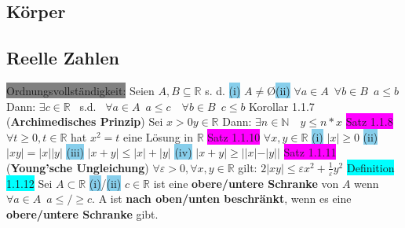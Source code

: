 \documentclass[landscape, 10pt]{article}
\newcommand{\R}{\mathbb{R}}
\newcommand{\N}{\mathbb{N}}
\begin{document}
\pagestyle{fancy}
\fancyhf{}
\cfoot{\thepage}

\begin{multicols}{3}
\section{Körper}
\subsection{Reelle Zahlen}
\colorbox{gray}{Ordnungsvollständigkeit:} Seien $A, B\subseteq\R$ s. d.
                \quad\colorbox{SkyBlue}{(i)} $A\neq$\O\colorbox{SkyBlue}{(ii)} 
                $\forall a\in A \enspace \forall b 
                \in B \enspace a \leqslant b$ 
         Dann: $\exists c\in\R\enspace$ 
                s.d. $\enspace\forall a\in A\enspace a\leqslant c\quad\forall b\in 
                B\enspace c\leqslant b$ 
\colorbox{BurntOrange}{Korollar 1.1.7} (\textbf{Archimedisches Prinzip}) 
                Sei \textcolor{NavyBlue}{$x>0 y\in\R$}
                \quad Dann: \textcolor{NavyBlue}{
                $\exists n\in \N \quad y\leqslant n*x$}
\colorbox{magenta}{Satz 1.1.8} \textcolor{NavyBlue}{
                $\forall t\geqslant 0, t\in\R$} hat \textcolor{NavyBlue}{$x^2=t$} 
                eine Lösung in $\R$
\colorbox{magenta}{Satz 1.1.10} $\forall x,y\in\R$ 
        \colorbox{SkyBlue}{(i)} $|x|\geqslant 0$ \quad\colorbox{SkyBlue}{(ii)} 
                $|xy|=|x||y|$ \quad
                \colorbox{SkyBlue}{(iii)} $|x+y|\leqslant |x|+|y|$
                \quad\colorbox{SkyBlue}{(iv)} $|x+y|\geqslant ||x|-|y||$
\colorbox{magenta}{Satz 1.1.11} (\textbf{Young'sche Ungleichung})
                \textcolor{NavyBlue}{
                $\forall\varepsilon >0, \forall x,y\in\R$} 
                gilt: \qquad \textcolor{NavyBlue}{
                $2|xy|\leqslant\varepsilon x^2+\frac{1}{\varepsilon}y^2$}
\colorbox{cyan}{Definition 1.1.12} Sei $A\subset\R$
         \colorbox{SkyBlue}{(i)}/\colorbox{SkyBlue}{(ii)} $c\in\R$ ist eine 
                \textbf{obere/untere Schranke }
                von $A$ wenn \textcolor{NavyBlue}{
                $\forall a \in A \enspace a\leqslant / \geqslant c$}. A ist 
                \textbf{nach oben/unten 
         beschränkt}, wenn es eine 
                \textbf{obere/untere Schranke} gibt. 

\end{multicols}
\end{document}
